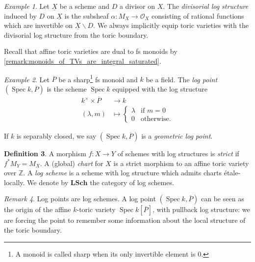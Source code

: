 \documentclass[a4paper,11pt]{amsart} %
\numberwithin{equation}{subsection}
\newcommand{\on}[1]{\operatorname{#1}}
\newcommand{\bb}[1]{{\mathbb{#1}}}
\newcommand{\ca}[1]{{\mathcal{#1}}}
\newcommand{\bd}[1]{{\mathbf{#1}}}
\newcommand{\ul}[1]{{\underline{#1}}}
\newcommand{\cat}[1]{\bd{#1}}
\def\o#1{\overline{#1}}
\newcommand{\Spec}{\operatorname{Spec}}
\theoremstyle{definition}
\newtheorem{definition}{Definition}[section]
\theoremstyle{plain}%
\theoremstyle{remark}
\newtheorem{remark}[definition]{Remark}
\newtheorem{example}[definition]{Example}
\begin{document}
\begin{example}\label{example:divisorial_log_structure}
    Let $\ul X$ be a scheme and $D$ a divisor on $X$. The \emph{divisorial log structure} induced by $D$ on $\ul X$ is the subsheaf $\alpha \colon M_X \to \ca O_X$ consisting of rational functions which are invertible on $\ul X \backslash D$. We always implicitly equip toric varieties with the divisorial log structure from the toric boundary.
\end{example}

Recall that affine toric varieties are dual to fs monoids by \ref{remark:monoids_of_TVs_are_integral_saturated}.

\begin{example}\label{example:log_point}
    Let $\o P$ be a sharp\footnote{A monoid is called sharp when its only invertible element is $0$.} fs monoid and $k$ be a field. The \emph{log point} $(\Spec k,\o P)$ is the scheme $\Spec k$ equipped with the log structure
    \begin{align*}
   k^\times \times \o P & \to k \\  
(\lambda,m) & \mapsto \left\{
    \begin{array}{ll}
        \lambda & \mbox{if } m=0 \\
        0 & \mbox{otherwise.}
    \end{array}
\right.
\end{align*}

    

   
    If $k$ is separably closed, we say $(\Spec k,\o P)$ is a \emph{geometric log point}.
\end{example}


\begin{definition}
    A morphism $f\colon X \to Y$ of schemes with log structures is \emph{strict} if $f^*M_Y = M_X$. A (global) \emph{chart} for $X$ is a strict morphism to an affine toric variety over $\bb Z$. A \emph{log scheme} is a scheme with log structure which admits charts \'etale-locally. We denote by $\cat{LSch}$ the category of log schemes.
\end{definition}

\begin{remark}
    Log points are log schemes. A log point $(\on{Spec} k, \o P)$ can be seen as the origin of the affine $k$-toric variety $\on{Spec}k[\o P]$, with pullback log structure: we are forcing the point to remember some information about the local structure of the toric boundary.
\end{remark}
\end{document}
